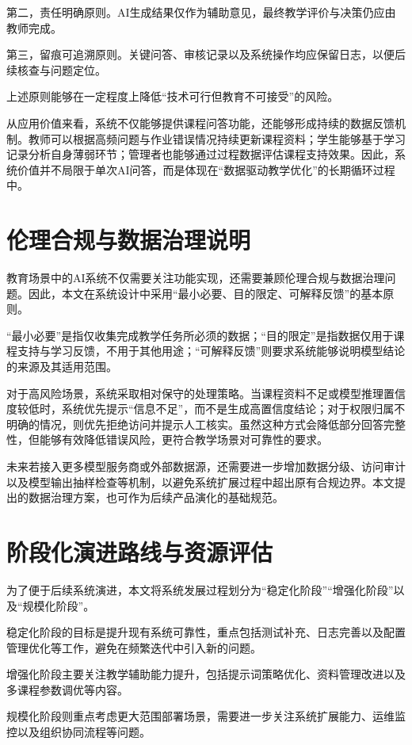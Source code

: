 \documentclass[12pt,a4paper,oneside]{ctexbook}
\numberwithin{equation}{chapter}
\begin{document}
第二，责任明确原则。AI生成结果仅作为辅助意见，最终教学评价与决策仍应由教师完成。

第三，留痕可追溯原则。关键问答、审核记录以及系统操作均应保留日志，以便后续核查与问题定位。

上述原则能够在一定程度上降低“技术可行但教育不可接受”的风险。

从应用价值来看，系统不仅能够提供课程问答功能，还能够形成持续的数据反馈机制。教师可以根据高频问题与作业错误情况持续更新课程资料；学生能够基于学习记录分析自身薄弱环节；管理者也能够通过过程数据评估课程支持效果。因此，系统价值并不局限于单次AI问答，而是体现在“数据驱动教学优化”的长期循环过程中。

\section{伦理合规与数据治理说明}

教育场景中的AI系统不仅需要关注功能实现，还需要兼顾伦理合规与数据治理问题。因此，本文在系统设计中采用“最小必要、目的限定、可解释反馈”的基本原则。

“最小必要”是指仅收集完成教学任务所必须的数据；“目的限定”是指数据仅用于课程支持与学习反馈，不用于其他用途；“可解释反馈”则要求系统能够说明模型结论的来源及其适用范围\cite{ref2,ref6,ref10}。

对于高风险场景，系统采取相对保守的处理策略。当课程资料不足或模型推理置信度较低时，系统优先提示“信息不足”，而不是生成高置信度结论；对于权限归属不明确的情况，则优先拒绝访问并提示人工核实。虽然这种方式会降低部分回答完整性，但能够有效降低错误风险，更符合教学场景对可靠性的要求\cite{ref6,ref10}。

未来若接入更多模型服务商或外部数据源，还需要进一步增加数据分级、访问审计以及模型输出抽样检查等机制，以避免系统扩展过程中超出原有合规边界。本文提出的数据治理方案，也可作为后续产品演化的基础规范\cite{ref2,ref10}。

\section{阶段化演进路线与资源评估}

为了便于后续系统演进，本文将系统发展过程划分为“稳定化阶段”“增强化阶段”以及“规模化阶段”。

稳定化阶段的目标是提升现有系统可靠性，重点包括测试补充、日志完善以及配置管理优化等工作，避免在频繁迭代中引入新的问题。

增强化阶段主要关注教学辅助能力提升，包括提示词策略优化、资料管理改进以及多课程参数调优等内容。

规模化阶段则重点考虑更大范围部署场景，需要进一步关注系统扩展能力、运维监控以及组织协同流程等问题。
\end{document}
